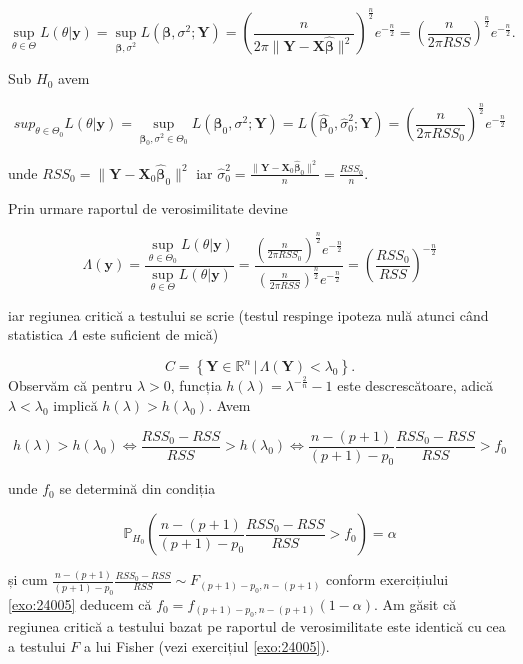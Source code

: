 \documentclass[]{article}
\newcounter{exo}[section]
\renewcommand\refname{Referințe}
\begin{document}
\[
\sup_{\theta\in\Theta}L(\theta|\mathbf{y}) = \sup_{\boldsymbol\beta, \sigma^2} L(\boldsymbol\beta, \sigma^2;\boldsymbol Y) = \left(\frac{n}{2\pi\lVert\boldsymbol Y - \boldsymbol X\hat{\boldsymbol\beta}\rVert^2}\right)^{\frac{n}{2}}e^{-\frac{n}{2}} = \left(\frac{n}{2\pi RSS}\right)^{\frac{n}{2}}e^{-\frac{n}{2}}.
\]

Sub \(H_0\) avem

\[
sup_{\theta\in\Theta_0}L(\theta|\mathbf{y}) = \sup_{\boldsymbol\beta_0, \sigma^2\in\Theta_0} L(\boldsymbol\beta_0, \sigma^2;\boldsymbol Y) = L(\hat{\boldsymbol\beta}_{0}, \hat{\sigma}^2_{0};\boldsymbol Y) = \left(\frac{n}{2\pi RSS_{0}}\right)^{\frac{n}{2}}e^{-\frac{n}{2}}
\]

unde
\(RSS_0 = \lVert\boldsymbol Y - \boldsymbol X_0\hat{\boldsymbol\beta}_0\rVert^2\)
iar
\(\hat{\sigma}^2_{0} = \frac{\lVert\boldsymbol Y - \boldsymbol X_0\hat{\boldsymbol\beta}_0\rVert^2}{n} = \frac{RSS_0}{n}\).

Prin urmare raportul de verosimilitate devine

\[
\Lambda(\mathbf{y})=\frac{\sup_{\theta\in\Theta_0}L(\theta|\mathbf{y})}{\sup_{\theta\in\Theta}L(\theta|\mathbf{y})} = \frac{\left(\frac{n}{2\pi RSS_{0}}\right)^{\frac{n}{2}}e^{-\frac{n}{2}}}{\left(\frac{n}{2\pi RSS}\right)^{\frac{n}{2}}e^{-\frac{n}{2}}} = \left(\frac{RSS_0}{RSS}\right)^{-\frac{n}{2}}
\]

iar regiunea critică a testului se scrie (testul respinge ipoteza nulă
atunci când statistica \(\Lambda\) este suficient de mică)

\[
C = \left\{\boldsymbol Y\in\mathbb{R}^n\,|\, \Lambda(\boldsymbol Y)< \lambda_0 \right\}.
\] Observăm că pentru \(\lambda>0\), funcția
\(h(\lambda) = \lambda^{-\frac{2}{n}}-1\) este descrescătoare, adică
\(\lambda<\lambda_0\) implică \(h(\lambda)>h(\lambda_0)\). Avem

\[
h(\lambda)>h(\lambda_0) \iff \frac{RSS_0 - RSS}{RSS}>h(\lambda_0) \iff \frac{n - (p+1)}{(p+1) - p_0}\frac{RSS_0 - RSS}{RSS}>f_0
\]

unde \(f_0\) se determină din condiția

\[
\mathbb{P}_{H_0}\left(\frac{n - (p+1)}{(p+1) - p_0}\frac{RSS_0 - RSS}{RSS}>f_0\right) = \alpha
\]

și cum
\(\frac{n - (p+1)}{(p+1) - p_0}\frac{RSS_0 - RSS}{RSS}\sim F_{(p+1) - p_0, n - (p+1)}\)
conform exercițiului \ref{exo:24005} deducem că
\(f_0 = f_{(p+1) - p_0, n - (p+1)}(1-\alpha)\). Am găsit că regiunea
critică a testului bazat pe raportul de verosimilitate este identică cu
cea a testului \(F\) a lui Fisher (vezi exercițiul \ref{exo:24005}).

\renewcommand\refname{Referințe}

\end{document}
